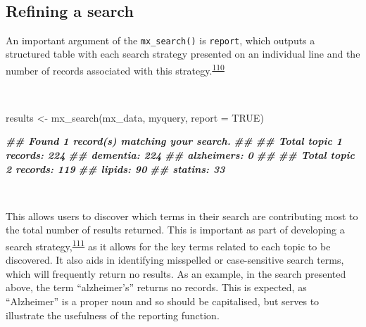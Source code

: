 \documentclass[a4paper, twoside]{templates/ociamthesis}
\newenvironment{Shaded}{\begin{snugshade}}{\end{snugshade}}
\newcommand{\AttributeTok}[1]{\textcolor[rgb]{0.77,0.63,0.00}{#1}}
\newcommand{\ConstantTok}[1]{\textcolor[rgb]{0.00,0.00,0.00}{#1}}
\newcommand{\DocumentationTok}[1]{\textcolor[rgb]{0.56,0.35,0.01}{\textbf{\textit{#1}}}}
\newcommand{\FunctionTok}[1]{\textcolor[rgb]{0.00,0.00,0.00}{#1}}
\newcommand{\NormalTok}[1]{#1}
\newcommand{\OtherTok}[1]{\textcolor[rgb]{0.56,0.35,0.01}{#1}}
\renewenvironment{Shaded}
{
  \vspace{4pt}%
  \begin{snugshade}%
}{%
  \end{snugshade}%
  \vspace{4pt}%
}
\begin{document}
~

\hypertarget{refining-a-search}{%
\subsection{Refining a search}\label{refining-a-search}}

An important argument of the \texttt{mx\_search()} is \texttt{report}, which outputs a structured table with each search strategy presented on an individual line and the number of records associated with this strategy.\textsuperscript{\protect\hyperlink{ref-rethlefsen2021prisma}{110}}

~

\begin{Shaded}
\begin{Highlighting}[]
\NormalTok{results  }\OtherTok{\textless{}{-}} \FunctionTok{mx\_search}\NormalTok{(mx\_data,}
\NormalTok{                      myquery,}
                      \AttributeTok{report =} \ConstantTok{TRUE}\NormalTok{)}
\end{Highlighting}
\end{Shaded}

\begin{Shaded}
\begin{Highlighting}[]
\DocumentationTok{\#\# Found 1 record(s) matching your search.}
\DocumentationTok{\#\# }
\DocumentationTok{\#\# Total topic 1 records: 224}
\DocumentationTok{\#\# dementia: 224}
\DocumentationTok{\#\# alzheimer\textquotesingle{}s: 0}
\DocumentationTok{\#\# }
\DocumentationTok{\#\# Total topic 2 records: 119}
\DocumentationTok{\#\# lipids: 90}
\DocumentationTok{\#\# statins: 33}
\end{Highlighting}
\end{Shaded}

~

This allows users to discover which terms in their search are contributing most to the total number of results returned. This is important as part of developing a search strategy,\textsuperscript{\protect\hyperlink{ref-bramer2018}{111}} as it allows for the key terms related to each topic to be discovered. It also aids in identifying misspelled or case-sensitive search terms, which will frequently return no results. As an example, in the search presented above, the term ``alzheimer's'' returns no records. This is expected, as ``Alzheimer'' is a proper noun and so should be capitalised, but serves to illustrate the usefulness of the reporting function.

~
\end{document}
